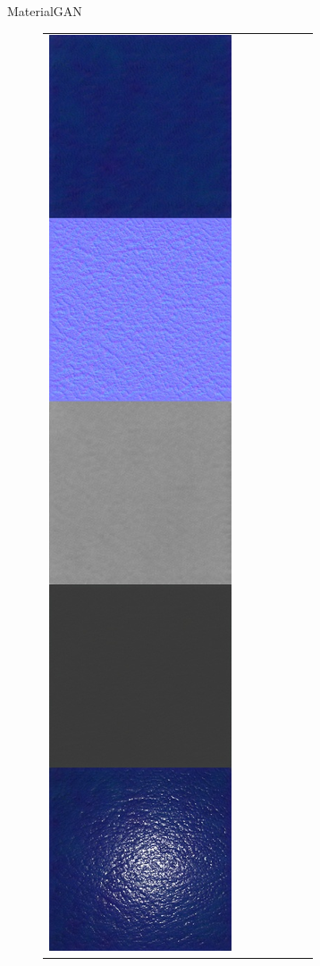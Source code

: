 \documentclass[final]{beamer}
\newlength{\twocolwid}
\newlength{\resLen}
\begin{document}
\begin{frame}[t]
\begin{columns}[t]
\begin{column}{\twocolwid}
\begin{block}{MaterialGAN}
\begin{figure}
\begin{tabular}{ccccccc}
					\includegraphics[width=\resLen]{others/matgan/12.jpg} &

\end{tabular}
\end{figure}
\end{block}
\end{column}
\end{columns}
\end{frame}
\end{document}
